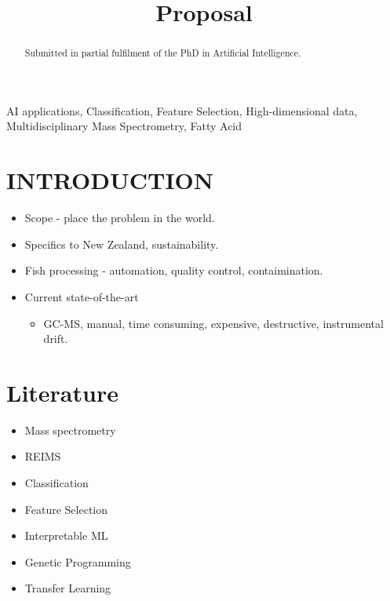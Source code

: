 \documentclass{article}
\title{Proposal}
\begin{document}
\maketitle
%
\begin{abstract}

  Submitted in partial fulfilment of the PhD in Artificial Intelligence.

\end{abstract}
%
\begin{keywords}
  AI applications, 
  Classification, 
  Feature Selection, 
  High-dimensional data, 
  Multidisciplinary 
  Mass Spectrometry, 
  Fatty Acid 
\end{keywords}
%

\section{INTRODUCTION}
\label{sec:introduction}

\begin{itemize}
  \item Scope - place the problem in the world. 
  \item Specifics to New Zealand, sustainability. 
  \item Fish processing - automation, quality control, contaimination. 
  \item Current state-of-the-art
  \begin{itemize}
    \item GC-MS, manual, time consuming, expensive, destructive, instrumental drift. 
  \end{itemize}
\end{itemize}

\section{Literature}
\label{sec:literature} 

\begin{itemize}
  \item Mass spectrometry \cite{eder1995gas}
  \item REIMS 
  \item Classification 
  \item Feature Selection 
  \item Interpretable ML 
  \item Genetic Programming 
  \item Transfer Learning 
\end{itemize}
\end{document}
